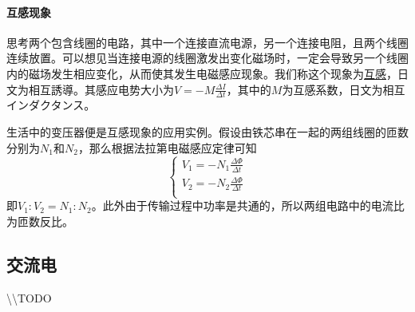 \paragraph{互感现象} 思考两个包含线圈的电路，其中一个连接直流电源，另一个连接电阻，且两个线圈连续放置。可以想见当连接电源的线圈激发出变化磁场时，一定会导致另一个线圈内的磁场发生相应变化，从而使其发生电磁感应现象。我们称这个现象为\underline{互感}，日文为相互誘導。其感应电势大小为$V=-M\frac{\Delta I}{\Delta t}$，其中的$M$为互感系数，日文为相互インダクタンス。

生活中的变压器便是互感现象的应用实例。假设由铁芯串在一起的两组线圈的匝数分别为$N_1$和$N_2$，那么根据法拉第电磁感应定律可知
\begin{equation*}
    \begin{cases}
        V_1=-N_1\frac{\Delta\Phi}{\Delta t}\\
        V_2=-N_2\frac{\Delta\Phi}{\Delta t}\\
    \end{cases}
\end{equation*}
即$V_1:V_2=N_1:N_2$。此外由于传输过程中功率是共通的，所以两组电路中的电流比为匝数反比。

\subsection{交流电}

\textbackslash\textbackslash TODO
